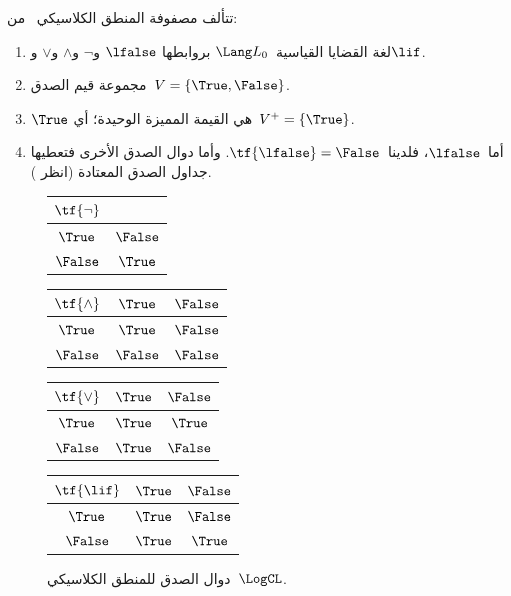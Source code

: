 \documentclass[../../../include/open-logic-section]{subfiles}
\begin{document}
\begin{ex}
تتألف مصفوفة المنطق الكلاسيكي~\LogCL{} من:
\begin{enumerate}
  \item لغة القضايا القياسية~$\Lang L_0$ بروابطها
  $\lfalse$ و$\lnot$ و$\land$ و$\lor$ و$\lif$.
  \item مجموعة قيم الصدق~$V = \{\True, \False\}$.
  \item $\True$ هي القيمة المميزة الوحيدة؛ أي~$V^+ = \{\True\}$.
  \item أما~$\lfalse$، فلدينا~$\tf{\lfalse} = \False$. وأما دوال
  الصدق الأخرى فتعطيها جداول الصدق المعتادة (انظر
  ).
\end{enumerate}
\begin{figure}
  \begin{center}
      \begin{tabular}{c|c}
        $\tf{\lnot}$ & \\
        \hline
        $\True$ & $\False$ \\
        $\False$ & $\True$
      \end{tabular}
      \quad
      \begin{tabular}{c|cc}
        $\tf{\land}$ & $\True$ & $\False$ \\
        \hline
        $\True$ & $\True$ & $\False$ \\
        $\False$ & $\False$ & $\False$
      \end{tabular}
      \quad
      \begin{tabular}{c|cc}
        $\tf{\lor}$ & $\True$ & $\False$ \\
        \hline
        $\True$ & $\True$ & $\True$ \\
        $\False$ & $\True$ & $\False$
      \end{tabular}
      \quad
      \begin{tabular}{c|cc}
        $\tf{\lif}$ & $\True$ & $\False$ \\
        \hline
        $\True$ & $\True$ & $\False$ \\
        $\False$ & $\True$ & $\True$
      \end{tabular}
    \end{center}
    \caption{دوال الصدق للمنطق الكلاسيكي~$\LogCL$.}
  \end{figure}
  \end{ex}
\end{document}

